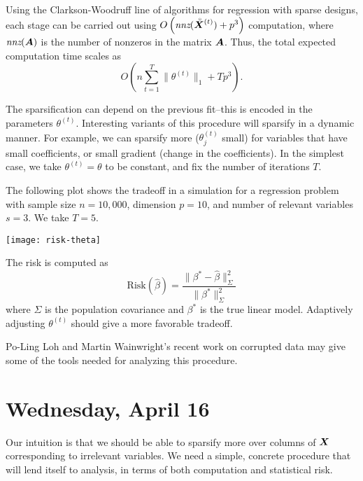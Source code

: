 \documentclass[12pt]{imsart}
\numberwithin{equation}{section}
\theoremstyle{plain}
\theoremstyle{remark}
\def\mbf#1{\mbox{\boldmath$#1$}}
\let\hat\widehat
\let\hat\widehat
\let\hat\widehat
\let\hat\widehat
\def\thetas#1{\theta^{(#1)}}
\def\X{\mbf{X}}
\def\Xs#1{\accentset{\;\circ}{\mbf{X}}^{(#1)}}
\begin{document}
Using the
Clarkson-Woodruff line of algorithms for regression with sparse designs, each stage can be carried out
using $O\left(\textit{nnz}(\Xs{t})+p^3\right)$ computation,
where $\textit{nnz}(\mbf{A})$ is the number of nonzeros in the matrix $\mbf{A}$.  Thus,
the total expected computation time scales as 
$$O\left(n\sum_{t=1}^T \|\thetas{t}\|_1 + Tp^3\right).$$

The sparsification can depend on the previous fit--this
is encoded in the parameters $\thetas{t}$.
Interesting variants of this procedure will sparsify in a dynamic
manner.  For example, we can sparsify more ($\thetas{t}_j$ small)
for variables that have small coefficients, or small gradient (change
in the coefficients).  
In the simplest case, we take $\thetas{t}=\theta$ to be constant, and
fix the number of iterations $T$.


The following plot shows the tradeoff in a simulation for a regression problem with
sample size $n=10{,}000$, dimension $p=10$, and number of relevant
variables $s=3$.  We take $T=5$.  

\begin{center}
  \texttt{[image: risk-theta]}
\end{center}

The risk is computed as
\begin{equation}
\text{Risk}(\hat \beta) = \frac{\|\beta^* - \hat\beta\|_{\Sigma}^2}{\|\beta^*\|_{\Sigma}^2}
\end{equation}
where $\Sigma$ is the population covariance and $\beta^*$ is the true
linear model. Adaptively adjusting $\thetas{t}$ should give a more
favorable tradeoff.

Po-Ling Loh and Martin Wainwright's recent work on corrupted data may
give some of the tools needed for analyzing this procedure.


\section*{Wednesday, April 16}

Our intuition is that we should be able to sparsify more over
columns of $\X$ corresponding to irrelevant variables.   We need a simple, concrete
procedure that will lend itself to analysis, in terms
of both computation and statistical risk.
\end{document}

